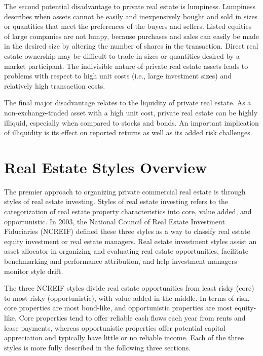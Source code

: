 \documentclass[11pt]{article}
\begin{document}
The second potential disadvantage to private real estate is lumpiness. Lumpiness describes when assets cannot be easily and inexpensively bought and sold in sizes or quantities that meet the preferences of the buyers and sellers. Listed equities of large companies are not lumpy, because purchases and sales can easily be made in the desired size by altering the number of shares in the transaction. Direct real estate ownership may be difficult to trade in sizes or quantities desired by a market participant. The indivisible nature of private real estate assets leads to problems with respect to high unit costs (i.e., large investment sizes) and relatively high transaction costs.

The final major disadvantage relates to the liquidity of private real estate. As a non-exchange-traded asset with a high unit cost, private real estate can be highly illiquid, especially when compared to stocks and bonds. An important implication of illiquidity is its effect on reported returns as well as its added risk challenges.

\section*{Real Estate Styles Overview}
The premier approach to organizing private commercial real estate is through styles of real estate investing. Styles of real estate investing refers to the categorization of real estate property characteristics into core, value added, and opportunistic. In 2003, the National Council of Real Estate Investment Fiduciaries (NCREIF) defined these three styles as a way to classify real estate equity investment or real estate managers. Real estate investment styles assist an asset allocator in organizing and evaluating real estate opportunities, facilitate benchmarking and performance attribution, and help investment managers monitor style drift.

The three NCREIF styles divide real estate opportunities from least risky (core) to most risky (opportunistic), with value added in the middle. In terms of risk, core properties are most bond-like, and opportunistic properties are most equity-like. Core properties tend to offer reliable cash flows each year from rents and lease payments, whereas opportunistic properties offer potential capital appreciation and typically have little or no reliable income. Each of the three styles is more fully described in the following three sections.
\end{document}
